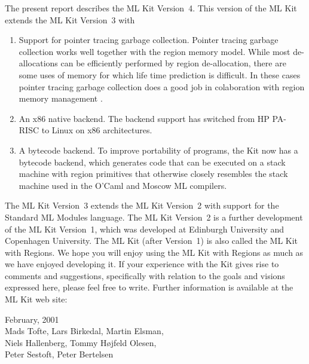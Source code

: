 \documentclass[12pt]{book}
\begin{document}
The present report describes the 
%
ML Kit Version~4. This version of the ML Kit extends the 
ML Kit Version~3 with
\begin{enumerate}
\item Support for pointer tracing garbage collection. Pointer tracing
  garbage collection works well together with the region memory model.
  While most de-allocations can be efficiently performed by region
  de-allocation, there are some uses of memory for which life time
  prediction is difficult. In these cases pointer tracing garbage
  collection does a good job in colaboration with region memory
  management \cite{hallenberg99}.
\item An x86 native backend. The 
  backend support has switched from HP PA-RISC to Linux on x86
  architectures.
  
\item A 
  bytecode backend. To improve portability of programs, the Kit now
  has a bytecode backend, which generates code that can be executed on
  a stack machine with region primitives that otherwise closely
  resembles the stack machine used in the O'Caml and Moscow ML
  compilers.
\end{enumerate}

The 
%
ML Kit Version~3 extends the ML Kit Version~2 with support for the
Standard ML Modules language. The
%
ML Kit Version~2 is a further development of the 
%
ML Kit Version~1, which was developed at Edinburgh University and
Copenhagen University.  The ML Kit (after Version~1) is also called
the ML Kit with Regions.  We hope you will enjoy using the ML Kit with
Regions as much as we have enjoyed developing it. If your experience
with the Kit gives rise to comments and suggestions, specifically with
relation to the goals and visions expressed here, please feel free to
write.  Further information is available at the ML Kit 
%
web site:
\begin{tabbing}
\hskip2cm
\end{tabbing}

\begin{flushright}
February, 2001\\[1cm]
Mads Tofte, Lars Birkedal, Martin Elsman,\\
Niels Hallenberg, Tommy H\o jfeld Olesen,\\
Peter Sestoft, Peter Bertelsen
\end{flushright}
\end{document}
